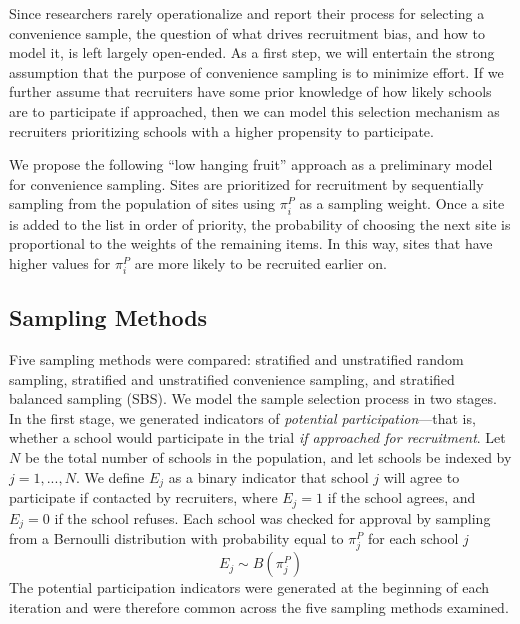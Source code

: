 \documentclass[man,floatsintext]{apa6}
\begin{document}
Since researchers rarely operationalize and report their process for selecting a convenience sample, the question of what drives recruitment bias, and how to model it, is left largely open-ended. As a first step, we will entertain the strong assumption that the purpose of convenience sampling is to minimize effort. If we further assume that recruiters have some prior knowledge of how likely schools are to participate if approached, then we can model this selection mechanism as recruiters prioritizing schools with a higher propensity to participate.

We propose the following \enquote{low hanging fruit} approach as a preliminary model for convenience sampling. Sites are prioritized for recruitment by sequentially sampling from the population of sites using \(\pi^P_i\) as a sampling weight. Once a site is added to the list in order of priority, the probability of choosing the next site is proportional to the weights of the remaining items. In this way, sites that have higher values for \(\pi^P_i\) are more likely to be recruited earlier on.

\hypertarget{sampling-methods}{%
\subsection{\texorpdfstring{Sampling Methods}{Sampling Methods}}\label{sampling-methods}}

Five sampling methods were compared: stratified and unstratified random sampling, stratified and unstratified convenience sampling, and stratified balanced sampling (SBS). We model the sample selection process in two stages. In the first stage, we generated indicators of \emph{potential participation}---that is, whether a school would participate in the trial \emph{if approached for recruitment}. Let \(N\) be the total number of schools in the population, and let schools be indexed by \(j = 1, ..., N\). We define \(E_j\) as a binary indicator that school \(j\) will agree to participate if contacted by recruiters, where \(E_j = 1\) if the school agrees, and \(E_j = 0\) if the school refuses. Each school was checked for approval by sampling from a Bernoulli distribution with probability equal to \(\pi^P_j\) for each school \(j\)
\begin{equation}
\label{eq:Ej}
E_j \sim B(\pi^P_j)
\end{equation}
The potential participation indicators were generated at the beginning of each iteration and were therefore common across the five sampling methods examined.
\end{document}
